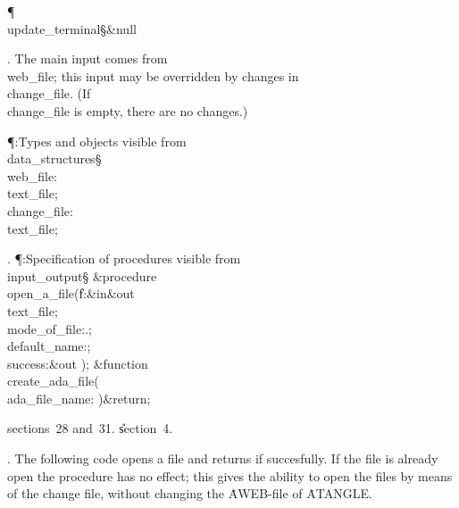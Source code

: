 \Y\P\4\D\\{update\_terminal}\?\S\?\&{null}\?\6
\?\par
\fi

. The main input comes from \\{web\_file}; this input may be overridden
by changes in \\{change\_file}.
(If \\{change\_file} is empty, there are no changes.)

\Y\P\?\4:Types and objects visible from \\{data\_structures}\X\mathrel{+}\S%
\?\6
\\{web\_file}\?:\?\\{text\_file};\6
\\{change\_file}\?:\?\\{text\_file};\par
\fi

. \P\?:Specification of procedures visible from \\{input\_output}\X\S\?%
\6
\&{procedure}\8\1\\{open\_a\_file}\?(\?\|f\?:\&{in}\?\8\&{out}\8\\{text\_file};%
\?\,\?\\{mode\_of\_file}\?:\?\?.\?;\?\,\?%
\\{default\_name}\?:\?;\?\,\1\?\\{success}\?:\?\&{out}\8%
\?\2)\?\2;\6
\&{function}\8\1\\{create\_ada\_file}\?(\1\?\\{ada\_file\_name}\?:\?%
\?\2)\&{return}\?\8\2;\par
\A sections~28 and~31.
\U section~4\*.\fi

. The following code opens a file and returns  if succesfully.
If the file is already open the procedure has no effect; this gives
the ability to open the files by means of the change file, without
changing the \.{AWEB}-file of \.{ATANGLE}.


